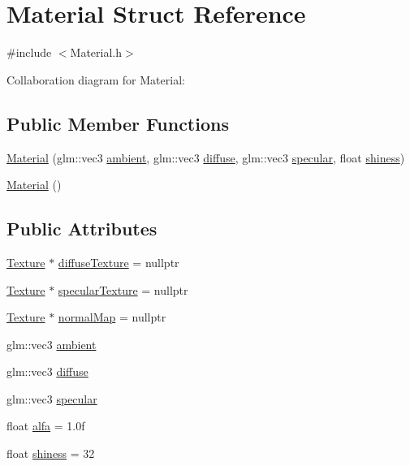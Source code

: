 \hypertarget{struct_material}{}\section{Material Struct Reference}
\label{struct_material}


{\ttfamily \#include $<$Material.\+h$>$}



Collaboration diagram for Material\+:
\subsection*{Public Member Functions}
\begin{DoxyCompactItemize}
\item 
\mbox{\hyperlink{struct_material_a0be7dba7f259e659502c4b543cdd7d8c}{Material}} (glm\+::vec3 \mbox{\hyperlink{struct_material_af99c823542e497c98a35d1aac5fc9012}{ambient}}, glm\+::vec3 \mbox{\hyperlink{struct_material_a099904e2f5a7bbec3cba6bf8ec546b11}{diffuse}}, glm\+::vec3 \mbox{\hyperlink{struct_material_aac1c499923ff99564cdd97a4b5e504a9}{specular}}, float \mbox{\hyperlink{struct_material_ac40b4d892e9bff09f793d86ca1f3257e}{shiness}})
\item 
\mbox{\hyperlink{struct_material_a137e987401b63eb7c6c27c3e38bc74b5}{Material}} ()
\end{DoxyCompactItemize}
\subsection*{Public Attributes}
\begin{DoxyCompactItemize}
\item 
\mbox{\hyperlink{class_texture}{Texture}} $\ast$ \mbox{\hyperlink{struct_material_a187af0c557b8521fa0a88507ae618c42}{diffuse\+Texture}} = nullptr
\item 
\mbox{\hyperlink{class_texture}{Texture}} $\ast$ \mbox{\hyperlink{struct_material_a1ca33d2644100f269b8289ddd08dd6e4}{specular\+Texture}} = nullptr
\item 
\mbox{\hyperlink{class_texture}{Texture}} $\ast$ \mbox{\hyperlink{struct_material_a915ba1f28243cdd67be5ccc70d4073d8}{normal\+Map}} = nullptr
\item 
glm\+::vec3 \mbox{\hyperlink{struct_material_af99c823542e497c98a35d1aac5fc9012}{ambient}}
\item 
glm\+::vec3 \mbox{\hyperlink{struct_material_a099904e2f5a7bbec3cba6bf8ec546b11}{diffuse}}
\item 
glm\+::vec3 \mbox{\hyperlink{struct_material_aac1c499923ff99564cdd97a4b5e504a9}{specular}}
\item 
float \mbox{\hyperlink{struct_material_ab331a289b85cc07810ded7f4ebb66175}{alfa}} = 1.\+0f
\item 
float \mbox{\hyperlink{struct_material_ac40b4d892e9bff09f793d86ca1f3257e}{shiness}} = 32
\end{DoxyCompactItemize}
